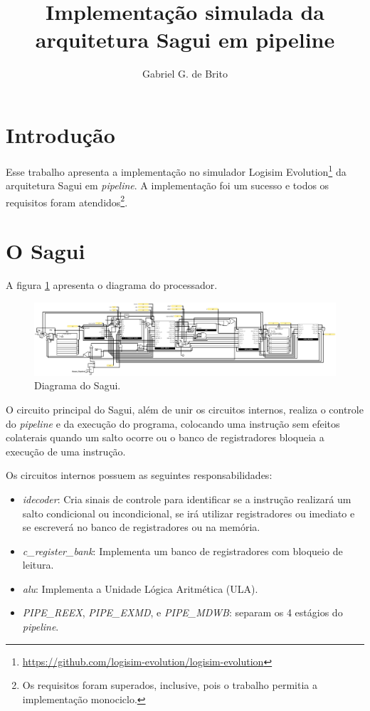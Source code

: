 \documentclass{article}
\author{Gabriel G. de Brito}
\title{Implementação simulada da arquitetura Sagui em pipeline}
\begin{document}
\maketitle

\section{Introdução}

Esse trabalho apresenta a implementação no simulador Logisim
Evolution\footnote{\url{https://github.com/logisim-evolution/logisim-evolution}}
da arquitetura Sagui em \textit{pipeline}. A implementação foi um sucesso e
todos os requisitos foram atendidos\footnote{Os requisitos foram superados,
inclusive, pois o trabalho permitia a implementação monociclo.}.

\section{O Sagui}

A figura \ref{sagui} apresenta o diagrama do processador.

\begin{figure}[ht]
	\centering
	\includegraphics[width=\textwidth]{main.png}
	\caption{Diagrama do Sagui.}
	\label{sagui}
\end{figure}

O circuito principal do Sagui, além de unir os circuitos internos, realiza o
controle do \textit{pipeline} e da execução do programa, colocando uma instrução
sem efeitos colaterais quando um salto ocorre ou o banco de registradores
bloqueia a execução de uma instrução.

Os circuitos internos possuem as seguintes responsabilidades:

\begin{itemize}
	\item \textit{idecoder}: Cria sinais de controle para identificar se a
	instrução realizará um salto condicional ou incondicional, se irá utilizar
	registradores ou imediato e se escreverá no banco de registradores ou na
	memória.
	\item \textit{c\_register\_bank}: Implementa um banco de registradores com
	bloqueio de leitura.
	\item \textit{alu}: Implementa a Unidade Lógica Aritmética (ULA).
	\item \textit{PIPE\_REEX}, \textit{PIPE\_EXMD}, e \textit{PIPE\_MDWB}: separam
	os 4 estágios do \textit{pipeline}.
\end{itemize}
\end{document}
